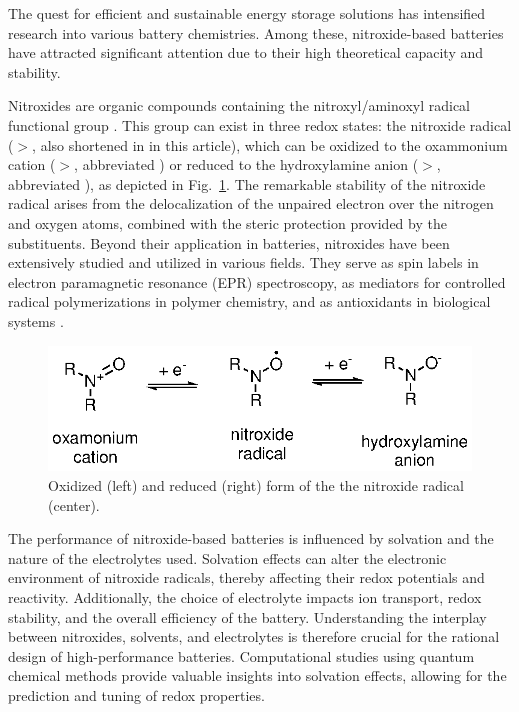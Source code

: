 \documentclass[review]{elsarticle}
\begin{document}
The quest for efficient and sustainable energy storage solutions has intensified research into various battery chemistries. Among these, nitroxide-based batteries have attracted significant attention due to their high theoretical capacity and stability.

Nitroxides are organic compounds containing the nitroxyl/aminoxyl radical functional group \cite{berlinerHistoryUseNitroxides2012}. This group can exist in three redox states: the nitroxide radical ($>$, also shortened in  in this article), which can be oxidized to the oxammonium cation ($>$, abbreviated ) or reduced to the hydroxylamine anion ($>$, abbreviated ), as depicted in Fig.~\ref{fig:states}. The remarkable stability of the nitroxide radical arises from the delocalization of the unpaired electron over the nitrogen and oxygen atoms, combined with the steric protection provided by the substituents. Beyond their application in batteries, nitroxides have been extensively studied and utilized in various fields. They serve as spin labels in electron paramagnetic resonance (EPR) spectroscopy, as mediators for controlled radical polymerizations in polymer chemistry, and as antioxidants in biological systems  \cite{souleChemistryBiologyNitroxide2007,lewandowskiNitroxidesAntioxidantsAnticancer2017}.

\begin{figure}[!h]
	\centering
	\includegraphics[width=.5\linewidth]{Figure1}
	\caption{Oxidized (left) and reduced (right) form of the the nitroxide radical (center).}
	\label{fig:states}
\end{figure}

The performance of nitroxide-based batteries is influenced by solvation and the nature of the electrolytes used. Solvation effects can alter the electronic environment of nitroxide radicals, thereby affecting their redox potentials and reactivity. Additionally, the choice of electrolyte impacts ion transport, redox stability, and the overall efficiency of the battery. Understanding the interplay between nitroxides, solvents, and electrolytes is therefore crucial for the rational design of high-performance batteries. Computational studies using quantum chemical methods provide valuable insights into solvation effects, allowing for the prediction and tuning of redox properties.
\end{document}
